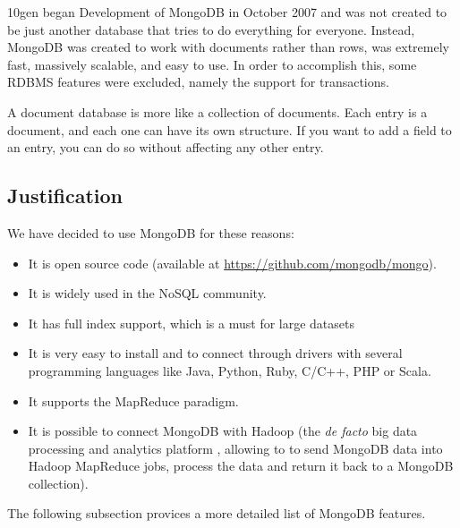 10gen began Development of MongoDB in October 2007 and was not created to be just another database that tries to do everything for everyone. Instead, MongoDB was created to work with documents rather than rows, was extremely fast, massively scalable, and easy to use. In order to accomplish this, some
RDBMS
features were excluded, namely
the
support for transactions.

A document database is more like a collection of documents. Each entry is a document, and each one can have its own structure. If you want to add a field to an entry, you can do so without affecting any other entry.



\subsection{Justification} %
\label{sub:justification}

We have decided to use MongoDB for these reasons:

\begin{itemize}
\item It is open source code (available at \url{https://github.com/mongodb/mongo}).
\item It is widely used in the NoSQL community.
\item It has full index %
support, which is a must for large datasets
\item It is very
easy to install and to connect through drivers with several programming languages like Java, Python, Ruby, C/C++, PHP or Scala.
\item It supports
the
MapReduce paradigm.
\item It is possible to connect MongoDB with Hadoop (the \emph{de facto} big data processing and analytics platform ,
allowing to to send MongoDB data into Hadoop MapReduce jobs, process the data and return it back to a MongoDB collection).
\end{itemize}

The following subsection provices a more detailed list of MongoDB features.



